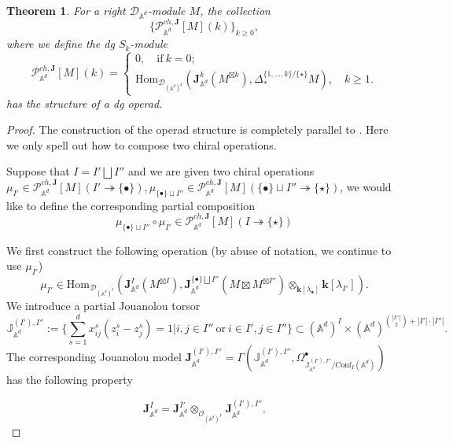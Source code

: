\documentclass[11pt]{amsart}
\newtheorem{thm}{Theorem}[section]
\theoremstyle{definition}
\theoremstyle{remark}
\numberwithin{equation}{section}
\begin{document}
\begin{thm}
  For a right $\mathcal{D}_{\mathbb{A}^d}$-module $M$, the collection 
  \[
    \{ \mathcal{P}^{ch,\mathbf{J}}_{\mathbb{A}^d}[M](k) \}_{k \geq 0},
  \]
  where we define the dg $S_k$-module
$$
\mathcal{P}^{ch,\mathbf{J}}_{\mathbb{A}^d}[M](k)=\begin{cases}
  0,\quad \text{if}\ k=0;\\
\mathrm{Hom}_{\mathcal{D}_{(\mathbb{A}^d)^{k}}}\left(\mathbf{J}_{\mathbb{A}^d}^{k}(M^{\boxtimes k}),\Delta^{\{1,\dots,k\}/\{\star\}}_*M\right),\quad k\geq 1.
\end{cases}
$$
has the structure of a dg operad.
\end{thm}
\begin{proof}
  The construction of the operad structure is completely parallel to \cite{FGY}. Here we only spell out how to compose two chiral operations.

    Suppose that ${I}={I'}\bigsqcup {I''}$ and we are given two chiral operations $\mu_{{I'}}\in   \mathcal{P}^{ch,\mathbf{J}}_{\mathbb{A}^d}[M](I'\twoheadrightarrow \{\bullet\}),\mu_{\{\bullet\}\sqcup I''}\in \mathcal{P}^{ch,\mathbf{J}}_{\mathbb{A}^d}[M](\{\bullet\}\sqcup I''\twoheadrightarrow \{\star\})$, we would like to define the corresponding partial composition
    $$
    \mu_{\{\bullet\}\sqcup I''}\circ \mu_{ I'}\in \mathcal{P}^{ch,\mathbf{J}}_{\mathbb{A}^d}[M](I\twoheadrightarrow \{\star\})
    $$
    
    
    We first construct the following operation (by abuse of notation, we continue to use $\mu_{{I'}}$)
    \[
\mu_{{I'}}\in \mathrm{Hom}_{\mathcal{D}_{(\mathbb{A}^d)^{{I}}}}\left(\mathbf{J}_{\mathbb{A}^d}^{{I}}(M^{\boxtimes{I}}),\mathbf{J}^{\{\bullet\}\bigsqcup{I''}}_{\mathbb{A}^d}(M\boxtimes M^{\boxtimes{I''}})\otimes_{\mathbf{k}[\lambda_{\bullet}]}\mathbf{k}[\lambda_{I'}]\right).
\]
We introduce a partial Jouanolou torsor
$$
\mathbb{J}_{\mathbb{A}^d}^{({I'}),{I''}}:=\{\sum_{s=1}^d x_{ij}^s(z^s_i-z^s_j)=1|i,j\in I''\ \text{or}\  i\in I', j\in I''\}\subset (\mathbb{A}^d)^{{I}}\times (\mathbb{A}^d)^{\binom{|I''|}{2}+|I'|\cdot |I''|}.
$$
The corresponding Jouanolou model $\mathbf{J}_{\mathbb{A}^d}^{({I'}),{I''}}=\Gamma(\mathbb{J}_{\mathbb{A}^d}^{({I'}),{I''}},\Omega^{\bullet}_{\mathbb{J}_{\mathbb{A}^d}^{({I'}),{I''}}/\mathrm{Conf}_{ I}(\mathbb{A}^d)})$ has the following property

$$
\mathbf{J}_{\mathbb{A}^d}^{{I}}=\mathbf{J}_{\mathbb{A}^d}^{{I'}}\otimes_{\mathcal{O}_{(\mathbb{A}^d)^{{I'}}}} \mathbf{J}_{\mathbb{A}^d}^{({I'}),{I''}}.
$$


\end{proof}
\end{document}
